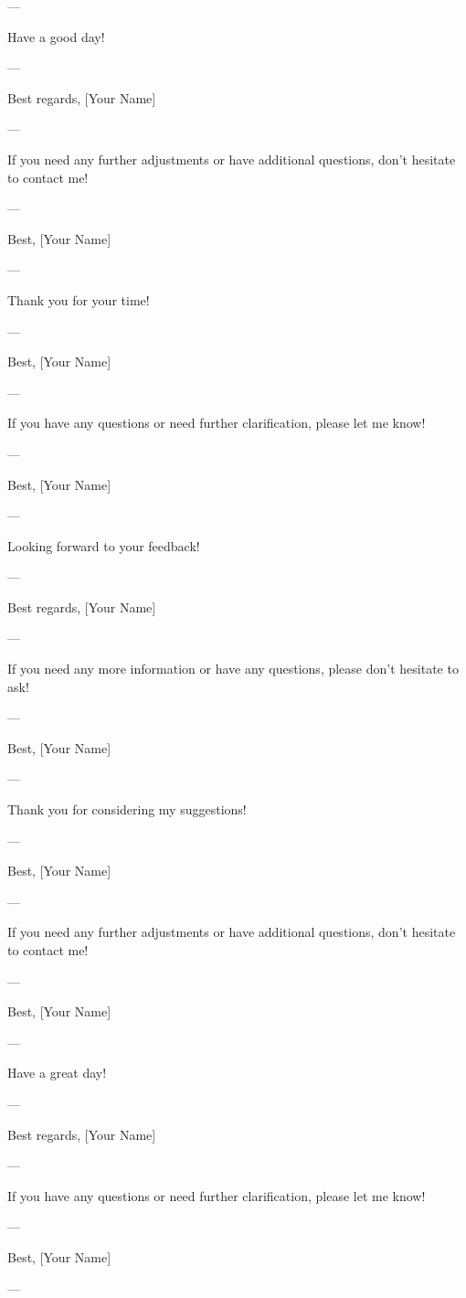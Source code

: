 --- 

Have a good day! 

--- 

Best regards,  
[Your Name]  

--- 

If you need any further adjustments or have additional questions, don't hesitate to contact me! 

--- 

Best,  
[Your Name]  

--- 

Thank you for your time! 

--- 

Best,  
[Your Name]  

--- 

If you have any questions or need further clarification, please let me know! 

--- 

Best,  
[Your Name]  

--- 

Looking forward to your feedback! 

--- 

Best regards,  
[Your Name]  

--- 

If you need any more information or have any questions, please don't hesitate to ask! 

--- 

Best,  
[Your Name]  

--- 

Thank you for considering my suggestions! 

--- 

Best,  
[Your Name]  

--- 

If you need any further adjustments or have additional questions, don't hesitate to contact me! 

--- 

Best,  
[Your Name]  

--- 

Have a great day! 

--- 

Best regards,  
[Your Name]  

--- 

If you have any questions or need further clarification, please let me know! 

--- 

Best,  
[Your Name]  

--- 

